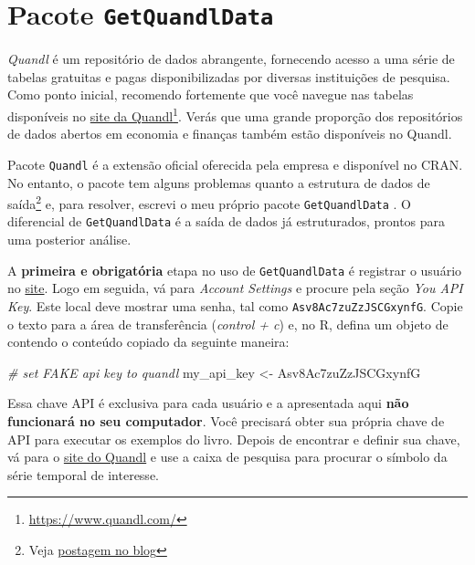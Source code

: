 \documentclass[
  11pt,
]{book}
\newenvironment{Shaded}{\begin{snugshade}}{\end{snugshade}}
\newcommand{\CommentTok}[1]{\textcolor[rgb]{0.37,0.37,0.37}{\textit{#1}}}
\newcommand{\NormalTok}[1]{#1}
\newcommand{\OtherTok}[1]{\textcolor[rgb]{0.37,0.37,0.37}{#1}}
\newcommand{\StringTok}[1]{\textcolor[rgb]{0.5,0.5,0.5}{#1}}
\begin{document}
\hypertarget{quandl}{%
\section{\texorpdfstring{Pacote \texttt{GetQuandlData}}{Pacote GetQuandlData}}\label{quandl}}

\emph{Quandl} é um repositório de dados abrangente, fornecendo acesso a uma série de tabelas gratuitas e pagas disponibilizadas por diversas instituições de pesquisa. Como ponto inicial, recomendo fortemente que você navegue nas tabelas disponíveis no \href{https://www.quandl.com/}{site da Quandl}\footnote{\url{https://www.quandl.com/}}. Verás que uma grande proporção dos repositórios de dados abertos em economia e finanças também estão disponíveis no Quandl. 

Pacote \texttt{Quandl} \citep{R-Quandl} é a extensão oficial oferecida pela empresa e disponível no CRAN. No entanto, o pacote tem alguns problemas quanto a estrutura de dados de saída\footnote{Veja \href{https://www.msperlin.com/post/2019-10-01-new-package-getquandldata/}{postagem no blog}} e, para resolver, escrevi o meu próprio pacote \texttt{GetQuandlData} \citep{R-GetQuandlData}. O diferencial de \texttt{GetQuandlData} é a saída de dados já estruturados, prontos para uma posterior análise.

A \textbf{primeira e obrigatória} etapa no uso de \texttt{GetQuandlData} é registrar o usuário no \href{https://www.quandl.com/}{site}. Logo em seguida, vá para \emph{Account Settings} e procure pela seção \emph{You API Key}. Este local deve mostrar uma senha, tal como \texttt{Asv8Ac7zuZzJSCGxynfG}. Copie o texto para a área de transferência (\emph{control + c}) e, no R, defina um objeto de contendo o conteúdo copiado da seguinte maneira:

\begin{Shaded}
\begin{Highlighting}[]
\CommentTok{\# set FAKE api key to quandl}
\NormalTok{my\_api\_key }\OtherTok{\textless{}{-}} \StringTok{\textquotesingle{}Asv8Ac7zuZzJSCGxynfG\textquotesingle{}}
\end{Highlighting}
\end{Shaded}

Essa chave API é exclusiva para cada usuário e a apresentada aqui \textbf{não funcionará no seu computador}. Você precisará obter sua própria chave de API para executar os exemplos do livro. Depois de encontrar e definir sua chave, vá para o \href{https://www.quandl.com/search}{site do Quandl} e use a caixa de pesquisa para procurar o símbolo da série temporal de interesse.
\end{document}
